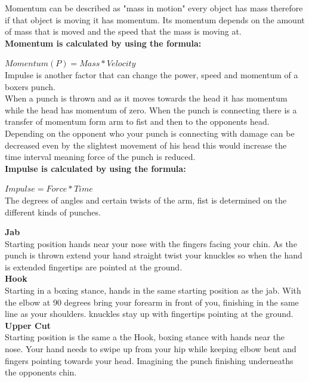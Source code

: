 \documentclass[a4paper,12pt,twoside]{report}
\begin{document}
Momentum can be described as "mass in motion" every object has mass therefore if that object is moving it has momentum. Its momentum depends on the amount of mass that is moved and the speed that the mass is moving at.\\

\textbf{Momentum is calculated by using the formula:}

$Momentum (P) = Mass * Velocity$\\

Impulse is another factor that can change the power, speed and momentum of a boxers punch. \\
When a punch is thrown and as it moves towards the head it has momentum while the head has momentum of zero.
When the punch is connecting there is a transfer of momentum form arm to fist and then to the opponents head. \\
Depending on the opponent who your punch is connecting with damage can be decreased even by the slightest movement of his head this would increase the time interval meaning force of the punch is reduced. \\

\textbf{Impulse is calculated by using the formula:}

$Impulse = Force * Time$ \cite{boxingPhysics}\\

The degrees of angles and certain twists of the arm, fist is determined on the different kinds of punches.

\textbf{Jab}\\
Starting position hands near your nose with the fingers facing your chin.
As the punch is thrown extend your hand straight twist your knuckles so when the hand is extended fingertips are pointed at the ground.\\

\textbf{Hook}\\
Starting in a boxing stance, hands in the same starting position as the jab.
With the elbow at 90 degrees bring your forearm in front of you, finishing in the same line as your shoulders. 
knuckles stay up with fingertips pointing at the ground.\\

\textbf{Upper Cut}\\
Starting position is the same a the Hook, boxing stance with hands near the nose. 
Your hand needs to swipe up from your hip while keeping elbow bent and fingers pointing towards your head. Imagining the punch finishing underneaths the opponents chin.\cite{punchingPhysics}
\end{document}
